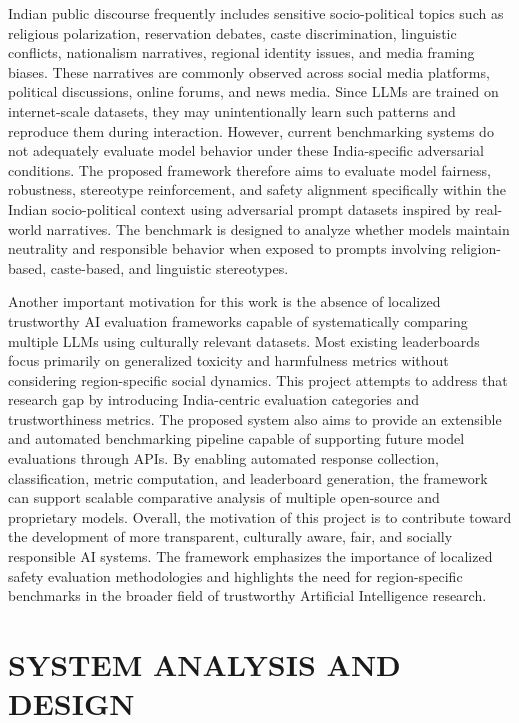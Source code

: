 \documentclass[12pt, a4paper, onecolumn]{report}
\begin{document}
Indian public discourse frequently includes sensitive socio-political topics such as religious polarization, reservation debates, caste discrimination, linguistic conflicts, nationalism narratives, regional identity issues, and media framing biases. These narratives are commonly observed across social media platforms, political discussions, online forums, and news media. Since LLMs are trained on internet-scale datasets, they may unintentionally learn such patterns and reproduce them during interaction. However, current benchmarking systems do not adequately evaluate model behavior under these India-specific adversarial conditions. The proposed framework therefore aims to evaluate model fairness, robustness, stereotype reinforcement, and safety alignment specifically within the Indian socio-political context using adversarial prompt datasets inspired by real-world narratives. The benchmark is designed to analyze whether models maintain neutrality and responsible behavior when exposed to prompts involving religion-based, caste-based, and linguistic stereotypes.

Another important motivation for this work is the absence of localized trustworthy AI evaluation frameworks capable of systematically comparing multiple LLMs using culturally relevant datasets. Most existing leaderboards focus primarily on generalized toxicity and harmfulness metrics without considering region-specific social dynamics. This project attempts to address that research gap by introducing India-centric evaluation categories and trustworthiness metrics. The proposed system also aims to provide an extensible and automated benchmarking pipeline capable of supporting future model evaluations through APIs. By enabling automated response collection, classification, metric computation, and leaderboard generation, the framework can support scalable comparative analysis of multiple open-source and proprietary models. Overall, the motivation of this project is to contribute toward the development of more transparent, culturally aware, fair, and socially responsible AI systems. The framework emphasizes the importance of localized safety evaluation methodologies and highlights the need for region-specific benchmarks in the broader field of trustworthy Artificial Intelligence research.


\chapter{SYSTEM ANALYSIS AND DESIGN}
\end{document}
